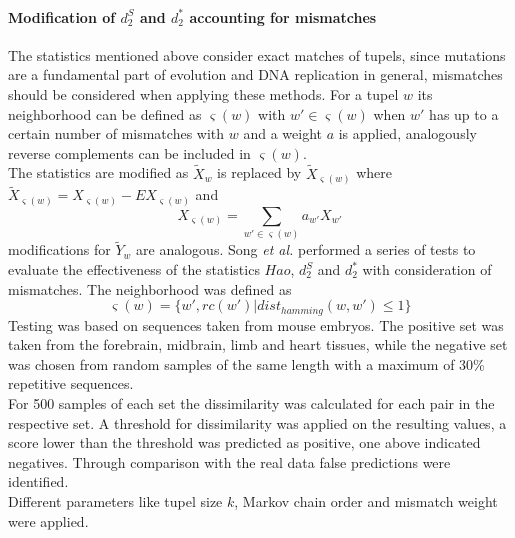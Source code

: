 \documentclass[twocolumn]{bmcart}%
\begin{document}
\paragraph*{Modification of $d_2^S$ and $d_2^*$ accounting for mismatches}
The statistics mentioned above consider exact matches of tupels, since mutations are a fundamental part of evolution and DNA replication in general, mismatches should be considered when applying these methods. For a tupel $w$ its neighborhood can be defined as $\varsigma(w)$ with $w' \in \varsigma(w)$ when $w'$ has up to a certain number of mismatches with $w$ and a weight $a$ is applied, analogously reverse complements can be included in $\varsigma(w)$.\\
The statistics are modified as $\widetilde{X}_w$ is replaced by $\widetilde{X}_{\varsigma(w)}$ where $\widetilde{X}_{\varsigma(w)}=X_{\varsigma(w)}-EX_{\varsigma(w)}$ and 
$$X_{\varsigma(w)}=\sum_{w'\in\varsigma(w)}a_{w'}X_{w'}$$ 
modifications for $\widetilde{Y}_w$ are analogous.
Song \textit{et al.} performed a series of tests to evaluate the effectiveness of the statistics $Hao$, $d_2^S$ and $d_2^*$ with consideration of mismatches. The neighborhood was defined as $$\varsigma(w)=\{w',rc(w')|dist_{hamming}(w,w')\leq 1\}$$
Testing was based on sequences taken from mouse embryos. The positive set was taken from the forebrain, midbrain, limb and heart tissues, while the negative set was chosen from random samples of the same length with a maximum of 30\% repetitive sequences\cite{doi:10.1093/bib/bbt067}.\\
For 500 samples of each set the dissimilarity was calculated for each pair in the respective set. A threshold for dissimilarity was applied on the resulting values, a score lower than the threshold was predicted as positive, one above indicated negatives. Through comparison with the real data false predictions were identified.\\
Different parameters like tupel size $k$, Markov chain order and mismatch weight were applied.
\end{document}

